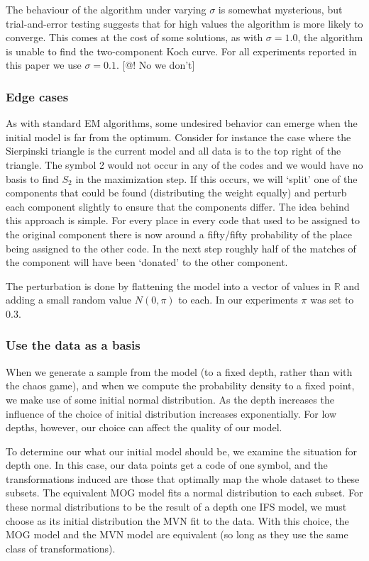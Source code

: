 \documentclass[10pt,a4paper,oneside]{article}
\theoremstyle{definition}
\begin{document}
The behaviour of the algorithm under varying $\sigma$ is somewhat mysterious, but trial-and-error testing suggests that for high values the algorithm is more likely to converge. This comes at the cost of some solutions, as with $\sigma = 1.0$, the algorithm is unable to find the two-component Koch curve. For all experiments reported in this paper we use $\sigma = 0.1$. [@! No we don't]

\subsubsection*{Edge cases}

As with standard EM algorithms, some undesired behavior can emerge when the initial model is far from the optimum. Consider for instance the case where the Sierpinski triangle is the current model and all data is to the top right of the triangle. The symbol 2 would not occur in any of the codes and we would have no basis to find $S_2$ in the maximization step. If this occurs, we will `split' one of the components that could be found  (distributing the weight equally) and perturb each component slightly to ensure that the components differ. The idea behind this approach is simple. For every place in every code that used to be assigned to the original component there is now around a fifty/fifty probability of the place being assigned to the other code. In the next step roughly half of the matches of the component will have been `donated' to the other component.

The perturbation is done by flattening the model into a vector of values in ${\mathbb R}$ and adding a small random value $N(0, \pi)$ to each. In our experiments $\pi$ was set to 0.3. 

\subsubsection*{Use the data as a basis}

When we generate a sample from the model (to a fixed depth, rather than with the chaos game), and when we compute the probability density to a fixed point, we make use of some initial normal distribution. As the depth increases the influence of the choice of initial distribution increases exponentially. For low depths, however, our choice can affect the quality of our model. 

To determine our what our initial model should be, we examine the situation for depth one. In this case, our data points get a code of one symbol, and the transformations induced are those that optimally map the whole dataset to these subsets. The equivalent MOG model fits a normal distribution to each subset. For these normal distributions to be the result of a depth one IFS model, we must choose as its initial distribution the MVN fit to the data. With this choice, the MOG model and the MVN model are equivalent (so long as they use the same class of transformations).
\end{document}
